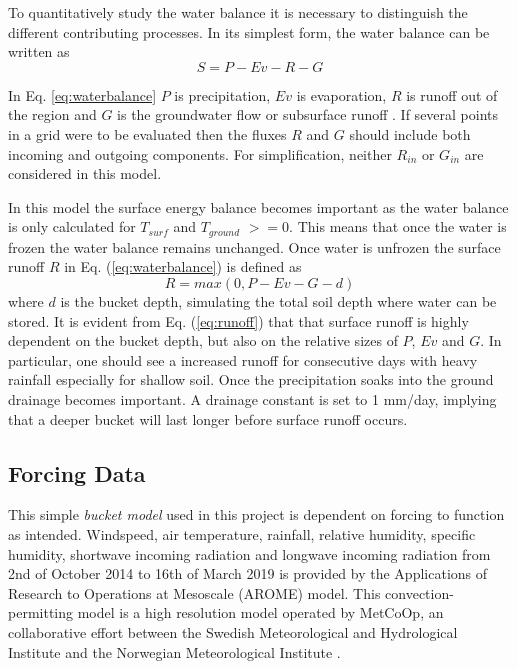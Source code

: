 \documentclass[a4paper,11pt,twocolumn]{article}
\begin{document}
To quantitatively study the water balance it is necessary to distinguish the different contributing processes. In its simplest form, the water balance can be written as 
\begin{equation}
	S = P - Ev - R - G 
	\label{eq:waterbalance}
\end{equation}

In Eq. \ref{eq:waterbalance} $P$ is precipitation, $Ev$ is evaporation, $R$ is runoff out of the region and $G$ is the groundwater flow or subsurface runoff \cite{dingman}. If several points in a grid were to be evaluated then the fluxes $R$ and $G$ should include both incoming and outgoing components. For simplification, neither $R_{in}$ or $G_{in}$ are considered in this model.   

In this model the surface energy balance becomes important as the water balance is only calculated for $T_{surf}$ and $T_{ground}$ $>=0$. This means that once the water is frozen the water balance remains unchanged. Once water is unfrozen the surface runoff $R$ in Eq. (\ref{eq:waterbalance}) is defined as
\begin{equation}
	R = max(0, P-Ev-G-d)
	\label{eq:runoff}
\end{equation}  
where $d$ is the bucket depth, simulating the total soil depth where water can be stored. It is evident from Eq. (\ref{eq:runoff}) that that surface runoff is highly dependent on the bucket depth, but also on the relative sizes of $P$, $Ev$ and $G$. In particular, one should see a increased runoff for consecutive days with heavy rainfall especially for shallow soil.  
Once the precipitation soaks into the ground drainage becomes important. A drainage constant is set to 1 mm/day, implying that a deeper bucket will last longer before surface runoff occurs. 

\subsection{Forcing Data}

This simple \textit{bucket model} used in this project is dependent on forcing to function as intended. Windspeed, air temperature, rainfall, relative humidity, specific humidity, shortwave incoming radiation and longwave incoming radiation from 2nd of October 2014 to 16th of March 2019 is provided by the Applications of Research to Operations at Mesoscale (AROME) model. This convection-permitting model is a high resolution model operated by MetCoOp, an collaborative effort between the Swedish Meteorological and Hydrological Institute and the Norwegian Meteorological Institute \cite{muller}. 
\end{document}
